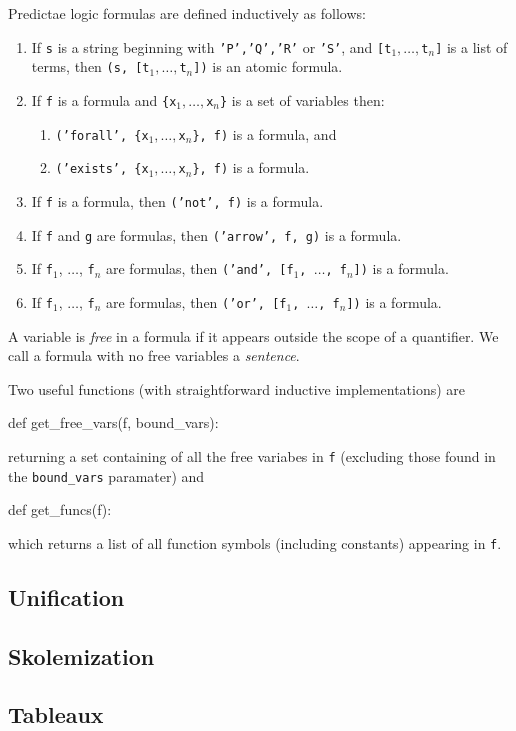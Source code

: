 \documentclass[a4paper,notitlepage]{scrartcl}
\begin{document}
Predictae logic formulas are defined inductively as follows:
\begin{enumerate}
\item If \texttt{s} is a string beginning with \texttt{'P','Q','R'} or \texttt{'S'}, and 
   \texttt{[t$_1,\ldots,$t$_n$]} is a list of terms, then \texttt{(s, [t$_1,
      \ldots, $t$_n$])} is an atomic formula.
\item If \texttt{f} is a formula and \texttt{\{x$_1,\ldots,$x$_n$\}} is a set of
   variables then:
   \begin{enumerate}
      \item \texttt{('forall', \{x$_1,\ldots,$x$_n$\}, f)} is a formula, and
      \item \texttt{('exists', \{x$_1,\ldots,$x$_n$\}, f)} is a formula.
   \end{enumerate}

\item
If \texttt{f} is a formula, then \texttt{('not', f)} is a formula.

\item
If \texttt{f} and \texttt{g} are formulas, then \texttt{('arrow', f, g)} is a
formula.

\item
If \texttt{f}$_1$, $\ldots$, \texttt{f}$_n$ are formulas, then \texttt{('and',
[f$_1$, $\ldots$, f$_n$])} is a formula.

\item
If \texttt{f}$_1$, $\ldots$, \texttt{f}$_n$ are formulas, then \texttt{('or',
[f$_1$, $\ldots$, f$_n$])} is a formula.
\end{enumerate}

A variable is \emph{free} in a formula if it appears outside the scope
   of a quantifier.
We call a formula with no free variables a \emph{sentence}.

Two useful functions (with straightforward inductive implementations) are
\begin{code}
def get_free_vars(f, bound_vars):
\end{code}
returning a set containing of all the free variabes in \texttt{f} (excluding those
   found in the \texttt{bound\_vars} paramater) and
\begin{code}
def get_funcs(f):
\end{code}
which returns a list of all function symbols (including constants) appearing
   in \texttt{f}.

\subsection{Unification}

\subsection{Skolemization}

\subsection{Tableaux}
\end{document}
